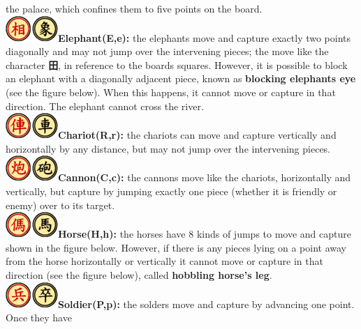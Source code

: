 \documentclass[12pt,a4paper]{article}
\begin{document}
the palace, which confines them to five points on the board.
\\\noindent
\textbf{\includegraphics{Xiangqi.assets/75px-Xiangqi_Elephant.png}Elephant(E,e):}
the elephants move and capture exactly two points diagonally and may not
jump over the intervening pieces; the move like the
character \textbf{田}, in reference to the board\textquotesingle s squares. 
However, it is possible to block an elephant with a diagonally adjacent piece, known as \textbf{blocking
elephant\textquotesingle s eye} (see the figure below). When this
happens, it cannot move or capture in that direction. The elephant cannot cross the river.
\\\noindent
\textbf{\includegraphics{Xiangqi.assets/75px-Xiangqi_Chariot.png}Chariot(R,r):}
the chariots can move and capture vertically and horizontally by any
distance, but may not jump over the intervening pieces.
\\\noindent
\textbf{\includegraphics{Xiangqi.assets/75px-Xiangqi_Cannon.png}Cannon(C,c):}
the cannons move like the chariots, horizontally and vertically, but
capture by jumping exactly one piece (whether it is friendly or enemy)
over to its target.
\\\noindent
\textbf{\includegraphics{Xiangqi.assets/75px-Xiangqi_Horse.png}Horse(H,h):}
the horses have 8 kinds of jumps to move and capture shown in the figure below. However, if there is any pieces lying on a point away from the
horse horizontally or vertically it cannot move or capture in that
direction (see the figure below), called \textbf{hobbling horse's
leg}.
\\\noindent
\textbf{\includegraphics{Xiangqi.assets/75px-Xiangqi_Soldier.png}Soldier(P,p):}
the solders move and capture by advancing one point. Once they have
\end{document}
